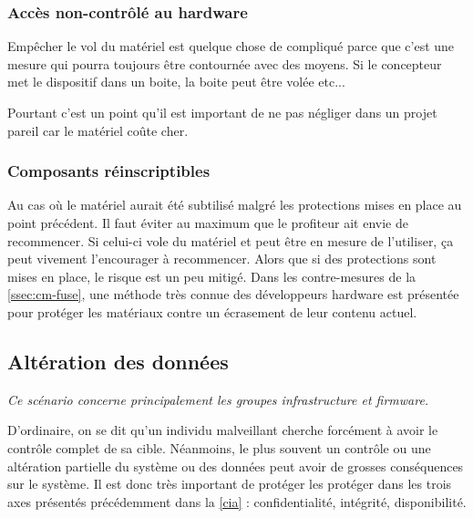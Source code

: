 \subsubsection{Accès non-contrôlé au hardware}

Empêcher le vol du matériel est quelque chose de compliqué parce que c'est une mesure qui pourra toujours être contournée avec des moyens. Si le concepteur met le dispositif dans un boite, la boite peut être volée etc... 

Pourtant c'est un point qu'il est important de ne pas négliger dans un projet pareil car le matériel coûte cher.

\subsubsection{Composants réinscriptibles}

Au cas où le matériel aurait été subtilisé malgré les protections mises en place au point précédent. Il faut éviter au maximum que le profiteur ait envie de recommencer. Si celui-ci vole du matériel et peut être en mesure de l'utiliser, ça peut vivement l'encourager à recommencer. Alors que si des protections sont mises en place, le risque est un peu mitigé. Dans les contre-mesures de la \autoref{ssec:cm-fuse}, une méthode très connue des développeurs hardware est présentée pour protéger les matériaux contre un écrasement de leur contenu actuel.


\subsection{Altération des données}

\emph{Ce scénario concerne principalement les groupes infrastructure et firmware.}
\medskip

D'ordinaire, on se dit qu'un individu malveillant cherche forcément à avoir le contrôle complet de sa cible. Néanmoins, le plus souvent un contrôle ou une altération partielle du système ou des données peut avoir de grosses conséquences sur le système. Il est donc très important de protéger les protéger dans les trois axes présentés précédemment dans la \autoref{cia} : confidentialité, intégrité, disponibilité.
\medskip

